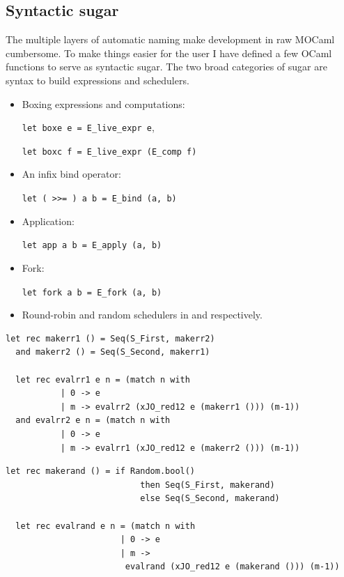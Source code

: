 \documentclass[12pt,twoside,notitlepage]{report}
\theoremstyle{plain}%
\theoremstyle{definition}
\theoremstyle{remark}
\begin{document}
\subsection{Syntactic sugar}
The multiple layers of automatic naming make development in raw MOCaml cumbersome.  To make things easier for the user I have defined a few OCaml functions to serve as syntactic sugar. The two broad categories of sugar are syntax to build expressions and schedulers. 
\begin{itemize}
\item{Boxing expressions and computations:

 \lstinline|let boxe e = E_live_expr e|,
 
 
 \lstinline|let boxc f = E_live_expr (E_comp f)|}
\item{An infix bind operator:


 \lstinline|let ( >>= ) a b = E_bind (a, b)|}
\item{Application:


 \lstinline|let app a b = E_apply (a, b)|}
\item{Fork:


 \lstinline|let fork a b = E_fork (a, b)|}
\item{Round-robin and random schedulers in  and  respectively.\label{sec:random_sched}}
\end{itemize}
\begin{minipage}{\linewidth}

\begin{lstlisting}[caption={OCaml round-robin scheduler}, label={lst:ocamlrrsched}]
  let rec makerr1 () = Seq(S_First, makerr2) 
  and makerr2 () = Seq(S_Second, makerr1) 
  
  let rec evalrr1 e n = (match n with 
           | 0 -> e
           | m -> evalrr2 (xJO_red12 e (makerr1 ())) (m-1))
  and evalrr2 e n = (match n with 
           | 0 -> e
           | m -> evalrr1 (xJO_red12 e (makerr2 ())) (m-1))
\end{lstlisting}

\end{minipage}
\begin{minipage}{\linewidth}

\begin{lstlisting}[caption={OCaml random scheduler}, label={lst:ocamlrandsched}]
  let rec makerand () = if Random.bool() 
                           then Seq(S_First, makerand) 
                           else Seq(S_Second, makerand)
  
  let rec evalrand e n = (match n with 
                       | 0 -> e
                       | m -> 
                        evalrand (xJO_red12 e (makerand ())) (m-1))
\end{lstlisting}

\end{minipage}
\end{document}
